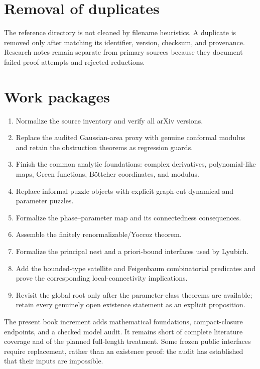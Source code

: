 \section{Removal of duplicates}

The reference directory is not cleaned by filename heuristics.  A duplicate
is removed only after matching its identifier, version, checksum, and
provenance.  Research notes remain separate from primary sources because
they document failed proof attempts and rejected reductions.

\section{Work packages}

\begin{enumerate}
\item Normalize the source inventory and verify all arXiv versions.
\item Replace the audited Gaussian-area proxy with genuine conformal
      modulus and retain the obstruction theorems as regression guards.
\item Finish the common analytic foundations: complex derivatives,
      polynomial-like maps, Green functions, Böttcher coordinates, and
      modulus.
\item Replace informal puzzle objects with explicit graph-cut dynamical and
      parameter puzzles.
\item Formalize the phase--parameter map and its connectedness consequences.
\item Assemble the finitely renormalizable/Yoccoz theorem.
\item Formalize the principal nest and a priori-bound interfaces used by
      Lyubich.
\item Add the bounded-type satellite and Feigenbaum combinatorial predicates
      and prove the corresponding local-connectivity implications.
\item Revisit the global root only after the parameter-class theorems are
      available; retain every genuinely open existence statement as an
      explicit proposition.
\end{enumerate}

The present book increment adds mathematical foundations,
compact-closure endpoints, and a checked model audit.  It remains
short of complete literature coverage and of the planned full-length
treatment.  Some frozen public interfaces require replacement,
rather than an existence proof: the audit has established that their
inputs are impossible.
